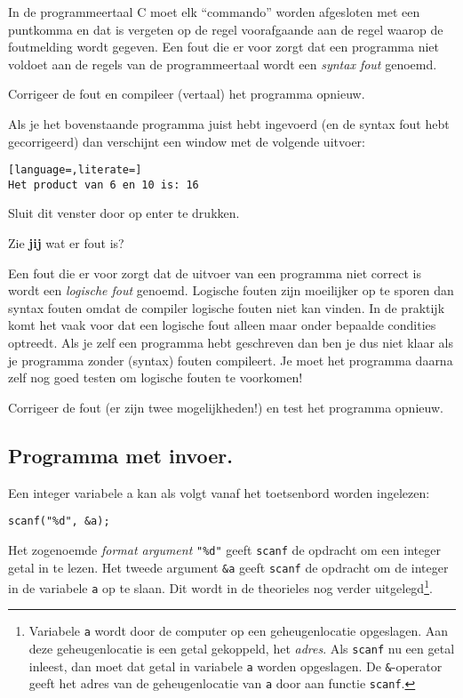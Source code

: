 \documentclass[a4paper,10pt,fleqn,twoside]{article}
\begin{document}
In de programmeertaal C moet elk ``commando'' worden afgesloten met een puntkomma en dat is vergeten op de regel voorafgaande aan de regel waarop de foutmelding wordt gegeven. Een fout die er voor zorgt dat een programma niet voldoet aan de regels van de programmeertaal wordt een \textsl{syntax fout} genoemd.

Corrigeer de fout en compileer (vertaal) het programma opnieuw.

Als je het bovenstaande programma juist hebt ingevoerd (en de syntax fout hebt gecorrigeerd) dan verschijnt een window met de volgende uitvoer:

\begin{lstlisting}[language=,literate=]
Het product van 6 en 10 is: 16
\end{lstlisting}

Sluit dit venster door op enter te drukken.

Zie \textbf{jij} wat er fout is?

Een fout die er voor zorgt dat de uitvoer van een programma niet correct is wordt een \textsl{logische fout} genoemd. Logische fouten zijn moeilijker op te sporen dan syntax fouten omdat de compiler logische fouten niet kan vinden. In de praktijk komt het vaak voor dat een logische fout alleen maar onder bepaalde condities optreedt. Als je zelf een programma hebt geschreven dan ben je dus niet klaar als je programma zonder (syntax) fouten compileert. Je moet het programma daarna zelf nog goed testen om logische fouten te voorkomen! 

Corrigeer de fout (er zijn twee mogelijkheden!) en test het programma opnieuw.

\subsection{Programma met invoer.}
Een integer variabele a kan als volgt vanaf het toetsenbord worden ingelezen:

\begin{lstlisting}
scanf("%d", &a);
\end{lstlisting}

Het  zogenoemde \textsl{format argument} \lstinline|"%d"| geeft \lstinline|scanf| de opdracht om een integer getal in te lezen. Het tweede argument \lstinline|&a| geeft \lstinline|scanf| de opdracht om de integer in de variabele \lstinline|a| op te slaan. Dit wordt in de theorieles nog verder uitgelegd\footnote{Variabele \lstinline|a| wordt door de computer op een geheugenlocatie opgeslagen. Aan deze geheugenlocatie is een getal gekoppeld, het \textsl{adres}. Als \lstinline|scanf| nu een getal inleest, dan moet dat getal in variabele \lstinline|a| worden opgeslagen. De \lstinline|&|-operator geeft het adres van de geheugenlocatie van \lstinline|a| door aan functie \lstinline|scanf|.}.
\end{document}
